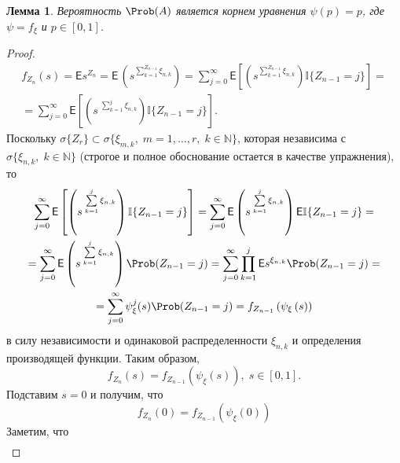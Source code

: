 \documentclass[a4paper]{article}
\newcommand{\Expect}{\mathsf{E}}
\theoremstyle{plain}
\newtheorem{lem}[thm]{Лемма}
\theoremstyle{definition}
\theoremstyle{remark}
\begin{document}
\begin{lem}
  Вероятность $\Prob(A)$ является корнем уравнения $\psi(p) = p$, где $\psi = f_{\xi}$ и $p \in [0, 1]$.
\end{lem}

\begin{proof}

  \begin{multline*}
    f_{Z_{n}}(s) = \Expect s^{Z_{n}} = \Expect \, \left(s^{\sum\limits_{k=1}^{Z_{n-1}} \xi_{n, k}}\right) = \sum\limits_{j=0}^{\infty} \Expect \left[ \left( s^{\sum\limits_{k=1}^{Z_{n-1}} \xi_{n, k}} \right)  \mathbb{I} \lbrace Z_{n-1} = j \rbrace \right] = \\ = \sum\limits_{j=0}^{\infty} \Expect \left[ \left( s \: ^{\sum\limits_{k=1}^{j} \xi_{n, k}} \right)  \mathbb{I} \lbrace Z_{n-1} = j \rbrace \right].
  \end{multline*}
  Поскольку $\sigma \lbrace Z_{r} \rbrace \subset \sigma \lbrace \xi_{m, k}, \; m = 1, \ldots, r, \; k \in \mathbb{N} \rbrace$, которая независима с $\sigma \lbrace \xi_{n, k}, \; k \in \mathbb{N} \rbrace$ (строгое и полное обоснование остается в качестве упражнения), то
  \begin{multline*}
    \sum\limits_{j=0}^{\infty} \Expect \left[ \left( s \: ^{\sum\limits_{k=1}^{j} \xi_{n, k}} \right)  \mathbb{I} \lbrace Z_{n-1} = j \rbrace \right]  =  \sum\limits_{j=0}^{\infty} \Expect \left(s \: ^{\sum\limits_{k=1}^{j} \xi_{n, k}}\right) \Expect \mathbb{I} \lbrace Z_{n-1} = j \rbrace  = \\ = \sum\limits_{j=0}^{\infty} \Expect \left(s \: ^{\sum\limits_{k=1}^{j} \xi_{n, k}}\right) \Prob ( Z_{n-1} = j ) = \sum\limits_{j=0}^{\infty} \prod\limits_{k=1}^{j} \Expect s^{\xi_{n, k}} \Prob (Z_{n-1} = j) = \\ = \sum\limits_{j=0}^{\infty} \psi_{\xi}^{j} (s) \Prob (Z_{n-1} = j)  =  f_{Z_{n-1}} \left(\psi_{\xi} \left(s \right) \right)
  \end{multline*}
  в силу независимости и одинаковой распределенности $\xi_{n, k}$ и определения производящей функции. Таким образом,
  \begin{equation*}
    f_{Z_{n}} (s) = f_{Z_{n-1}} \left( \psi_{\xi} \left(s \right)\right){,}\; s \in [0, 1]{.}
  \end{equation*}
  Подставим $s = 0$ и получим, что
  \begin{equation*}
    f_{Z_{n}} (0) = f_{Z_{n-1}} \left( \psi_{\xi} \left(0 \right)\right)
  \end{equation*}
  Заметим, что
  \begin{multline*}

\end{multline*}
\end{proof}
\end{document}
